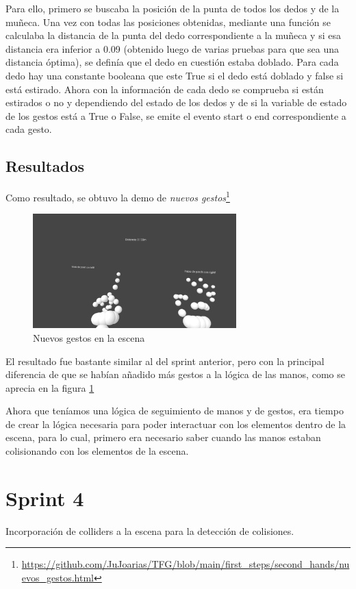 \documentclass[a4paper, 12pt]{book}
\begin{document}
Para ello, primero se buscaba la posición de la punta de todos los dedos y de la muñeca. Una vez con todas las posiciones obtenidas, mediante una función se calculaba la distancia de la punta del dedo correspondiente a la muñeca y si esa distancia era inferior a 0.09 (obtenido luego de varias pruebas para que sea una distancia óptima), se definía que el dedo en cuestión estaba doblado.
Para cada dedo hay una constante booleana que este True si el dedo está doblado y false si está estirado. Ahora con la información de cada dedo se comprueba si están estirados o no y dependiendo del estado de los dedos y de si la variable de estado de los gestos está a True o False, se emite el evento start o end correspondiente a cada gesto. 

\subsection{Resultados}
\label{subsec:resultados3}
Como resultado, se obtuvo la demo de \textit{nuevos gestos}\footnote{\url{https://github.com/JuJoarias/TFG/blob/main/first_steps/second_hands/nuevos_gestos.html}}

\begin{figure}[H] 
  \centering
  \includegraphics[width=0.7\textwidth]{img/nuevos_gestos.jpg} 
  \caption{Nuevos gestos en la escena}
  \label{fig:sprint3}
\end{figure}

El resultado fue bastante similar al del sprint anterior, pero con la principal diferencia de que se habían añadido más gestos a la lógica de las manos, como se aprecia en la figura \ref{fig:sprint3}

Ahora que teníamos una lógica de seguimiento de manos y de gestos, era tiempo de crear la lógica necesaria para poder interactuar con los elementos dentro de la escena, para lo cual, primero era necesario saber cuando las manos estaban colisionando con los elementos de la escena. 
\section{Sprint 4}
\label{sec:sprint4}
Incorporación de colliders a la escena para la detección de colisiones.
\end{document}
